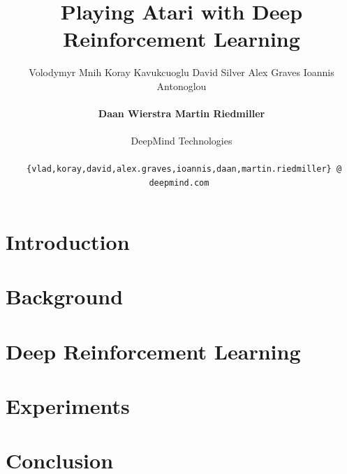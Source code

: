 \documentclass{article} %
\title{Playing Atari with Deep Reinforcement Learning}
\author{
Volodymyr Mnih \hspace{0.3cm}
Koray Kavukcuoglu \hspace{0.3cm}
David Silver \hspace{0.3cm}
Alex Graves \hspace{0.3cm} 
Ioannis Antonoglou\\
\\
{\bf Daan Wierstra \hspace{0.3cm}
Martin Riedmiller}\\
\\
DeepMind Technologies\\
\\
\small{\texttt{ \{vlad,koray,david,alex.graves,ioannis,daan,martin.riedmiller\} @ deepmind.com }}
}
\begin{document}
\maketitle

\begin{abstract}

\end{abstract}

\newcommand{\ssq}{s^{(t)}}
\newcommand{\asq}{a^{(t)}}
\newcommand{\pasq}{a^{(t-1)}}
\newcommand{\stpn}{s_{t+1}}
\newcommand{\qpi}{Q^{\pi}\left(\ssq,a_t\right)}
\newcommand{\vpi}{V^{\pi}\left(\ssq\right)}
\newcommand{\aqpi}{\hat{Q}^{\pi}}

\newcommand{\prob}[1]{\mathbb{P} \left[ #1 \right]}
\newcommand{\given}{|}
\newcommand{\expect}[1]{\mathbb{E} \left[ #1 \right]}
\newcommand{\expectx}[2]{\mathbb{E}_{#1} \left[ #2 \right]}
\newcommand{\eqdef}{\stackrel{def}{=}}


\section{Introduction}
\label{sec:introduction}


\section{Background}
\label{sec:background}


\section{Deep Reinforcement Learning}
\label{sec:method}


\section{Experiments}
\label{sec:experiments}


\vspace{-0.3cm}
\section{Conclusion}
\vspace{-0.2cm}
\label{sec:conclusion}







\end{document}
